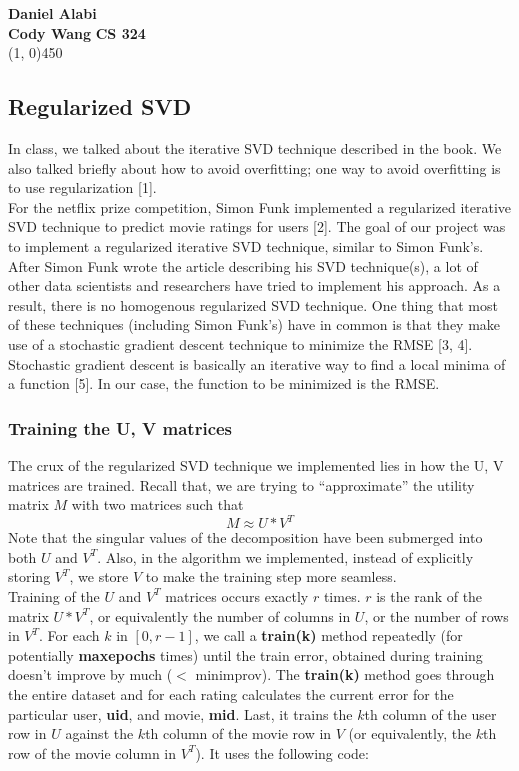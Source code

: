 \documentclass[12pt]{article}
\begin{document}
\noindent \textbf{Daniel Alabi} \\
\textbf{Cody Wang}
\hfill
\textbf{CS 324}\\
\line(1, 0){450} 

\subsection*{Regularized SVD}

In class, we talked about the iterative SVD technique described in the book.
We also talked briefly about how to avoid overfitting; one way to avoid
overfitting is to use regularization [1]. \\

\noindent For the netflix prize competition, Simon Funk implemented a regularized 
iterative SVD technique to predict movie ratings for users [2]. The goal of our
project was to implement a regularized iterative SVD technique, similar
to Simon Funk's. After Simon Funk wrote the article describing his
SVD technique(s), a lot of other data scientists and researchers
have tried to implement his approach. As a result, there is no homogenous
regularized SVD technique. One thing that most of these techniques (including
Simon Funk's) have in common is that they make use of a stochastic 
gradient descent technique to minimize the RMSE [3, 4]. Stochastic gradient 
descent is basically an iterative way to find a local minima of a 
function [5]. In our case, the function to be minimized is the RMSE.

\subsubsection*{Training the U, V matrices}
The crux of the regularized SVD technique we implemented lies in how
the U, V matrices are trained. Recall that, we are trying to ``approximate''
the utility matrix $M$ with two matrices such that
\begin{equation*}
  M \approx U * V^T
\end{equation*}
Note that the singular values of the decomposition have been submerged into
both $U$ and $V^T$. Also, in the algorithm we implemented, instead of 
explicitly storing $V^T$, we store $V$ to make the training step more
seamless. \\

\noindent Training of the $U$ and $V^T$ matrices occurs exactly $r$ times. $r$ is the
rank of the matrix $U*V^T$, or equivalently the number of columns in
$U$, or the number of rows in $V^T$. For each $k$ in $[0, r-1]$, we
call a \textbf{train(k)} method repeatedly (for potentially 
\textbf{maxepochs} times) until the train error, obtained during training
doesn't improve by much ($<$ minimprov). The \textbf{train(k)} method
goes through the entire dataset and for each rating calculates the current
error for the particular user, \textbf{uid}, and movie, \textbf{mid}.
Last, it trains the $k$th column of the user row in $U$ against the
$k$th column of the movie row in $V$ (or equivalently, the $k$th row
of the movie column in $V^T$). It uses the following code:
\end{document}
